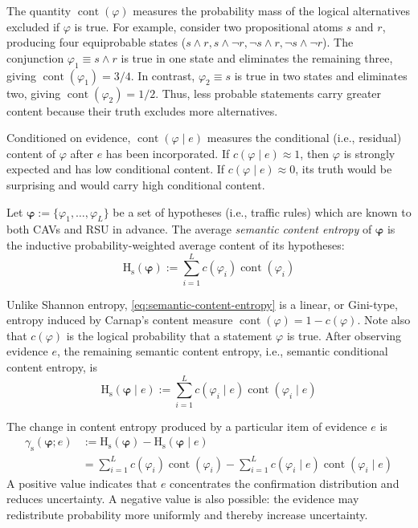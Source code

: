 \documentclass[10pt, conference, letterpaper]{ IEEEtran}
\theoremstyle{bfnote}
\begin{document}
The quantity $\operatorname{cont}(\varphi)$ measures the probability mass
of the logical alternatives excluded if $\varphi$ is true. For example,
consider two propositional atoms $s$ and $r$, producing four equiprobable
states ($s\land r, s\land \neg r, \neg s\land r, \neg s\land \neg r$). The conjunction
$
    \varphi_1\equiv s\land r
$
is true in one state and eliminates the remaining three, giving
$\operatorname{cont}(\varphi_1)=3/4$. In contrast,
$
    \varphi_2\equiv s
$
is true in two states and eliminates two, giving
$\operatorname{cont}(\varphi_2)=1/2$. Thus, less probable statements carry
greater content because their truth excludes more alternatives.

Conditioned on evidence, $\operatorname{cont}(\varphi\mid e)$ measures the
conditional (i.e., residual) content of $\varphi$ after $e$ has been incorporated. If
$c(\varphi\mid e)\approx1$, then $\varphi$ is strongly expected and has low
conditional content. If $c(\varphi\mid e)\approx0$, its truth would be
surprising and would carry high conditional content.

Let
$
    \boldsymbol{\varphi}
    :=
    \{\varphi_1,\ldots,\varphi_L\}
$
be a set of hypotheses (i.e., traffic rules) which are known to both CAVs and RSU in advance. The average \emph{semantic content entropy} of
$\boldsymbol{\varphi}$ is the inductive probability-weighted average content of its
hypotheses:
\begin{equation}
\label{eq:semantic-content-entropy}
\mathrm{H}_{\mathrm{s}}(\boldsymbol{\varphi})
:=
\sum_{i=1}^{L}
c(\varphi_i)\operatorname{cont}(\varphi_i)
\end{equation}

Unlike Shannon entropy, \eqref{eq:semantic-content-entropy} is a linear, or
Gini-type, entropy induced by Carnap's content measure
$\operatorname{cont}(\varphi)=1-c(\varphi)$. Note also that $c(\varphi)$ is the logical probability that a statement $\varphi$ is true. After observing evidence $e$, the remaining semantic content entropy, i.e., semantic conditional content entropy, is
\begin{equation}
\label{eq:conditional-semantic-content-entropy}
\mathrm{H}_{\mathrm{s}}(\boldsymbol{\varphi}\mid e)
:=
\sum_{i=1}^{L}
c(\varphi_i\mid e)
\operatorname{cont}(\varphi_i\mid e)
\end{equation}

The change in content entropy produced by a particular item of evidence
$e$ is
\begin{equation}
\label{eq:semantic-entropy-reduction}
\begin{aligned}
\gamma_{\mathrm{s}}(\boldsymbol{\varphi};e)
&:=
\mathrm{H}_{\mathrm{s}}(\boldsymbol{\varphi})
-
\mathrm{H}_{\mathrm{s}}(\boldsymbol{\varphi}\mid e)\\
&=
\sum_{i=1}^{L}
c(\varphi_i)\operatorname{cont}(\varphi_i)
-
\sum_{i=1}^{L}
c(\varphi_i\mid e)
\operatorname{cont}(\varphi_i\mid e)
\end{aligned}
\end{equation}
A positive value indicates that $e$ concentrates the confirmation
distribution and reduces uncertainty. A negative value is also possible:
the evidence may redistribute probability more uniformly and thereby
increase uncertainty.
\end{document}
